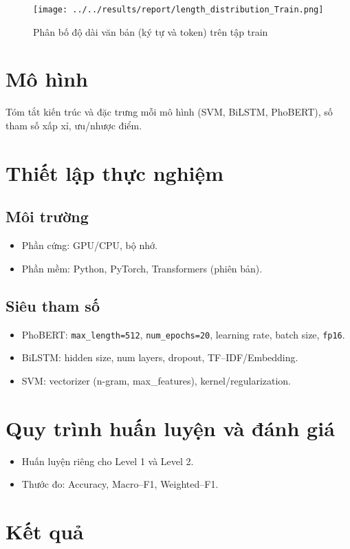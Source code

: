 \documentclass[12pt,a4paper]{article}
\begin{document}
\begin{figure}[H]
  \centering
  \texttt{[image: ../../results/report/length\_distribution\_Train.png]}
  \caption{Phân bố độ dài văn bản (ký tự và token) trên tập train}
\end{figure}

\section{Mô hình}
Tóm tắt kiến trúc và đặc trưng mỗi mô hình (SVM, BiLSTM, PhoBERT), số tham số xấp xỉ, ưu/nhược điểm.

\section{Thiết lập thực nghiệm}
\subsection{Môi trường}
\begin{itemize}
  \item Phần cứng: GPU/CPU, bộ nhớ.
  \item Phần mềm: Python, PyTorch, Transformers (phiên bản).
\end{itemize}

\subsection{Siêu tham số}
\begin{itemize}
  \item PhoBERT: \texttt{max\_length=512}, \texttt{num\_epochs=20}, learning rate, batch size, \texttt{fp16}.
  \item BiLSTM: hidden size, num layers, dropout, TF--IDF/Embedding.
  \item SVM: vectorizer (n-gram, max\_features), kernel/regularization.
\end{itemize}

\section{Quy trình huấn luyện và đánh giá}
\begin{itemize}
  \item Huấn luyện riêng cho Level 1 và Level 2.
  \item Thước đo: Accuracy, Macro--F1, Weighted--F1.
\end{itemize}

\section{Kết quả}
\end{document}
